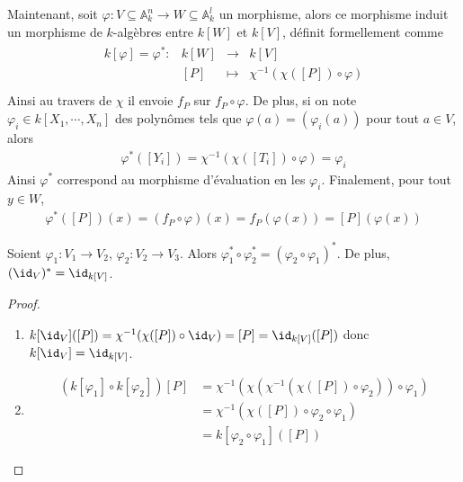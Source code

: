             Maintenant, soit $\varphi : V \subseteq \mathbb{A}_k^n \to W \subseteq \mathbb{A}_k^l$ un morphisme, alors ce morphisme induit un morphisme de $k$-algèbres entre $k[W]$ et $k[V]$, définit formellement comme
            \begin{align*}
                \begin{array}{cccc}
                    k[\varphi] = \varphi^* : & k[W] & \to & k[V] \\
                    & [P] & \mapsto & \chi^{-1}(\chi([P]) \circ \varphi) \\
                \end{array}
            \end{align*}
            Ainsi au travers de $\chi$ il envoie $f_P$ sur $f_P \circ \varphi$. De plus, si on note $\varphi_i \in k[X_1, \cdots, X_n]$ des polynômes tels que $\varphi(a) = (\varphi_i(a))$ pour tout $a \in V$, alors 
            \begin{align*}
                \varphi^*([Y_i]) = \chi^{-1}(\chi([T_i]) \circ \varphi) = \varphi_i
            \end{align*}
            Ainsi $\varphi^*$ correspond au morphisme d'évaluation en les $\varphi_i$. Finalement, pour tout $y \in W$,
            \begin{align*}
                \varphi^*([P])(x) = (f_P \circ \varphi)(x) = f_P(\varphi(x)) = [P](\varphi(x))
            \end{align*}
            \begin{prop}
                \label{phistarfunct}
                Soient $\varphi_1 : V_1 \to V_2$, $\varphi_2 : V_2 \to V_3$. Alors $\varphi_1^* \circ \varphi_2^* = (\varphi_2 \circ \varphi_1)^*$. De plus, $(\id_V)^* = \id_{k[V]}$.
            \end{prop}
            \begin{proof}
                \begin{enumerate}
                    \item $k[\id_V]([P]) = \chi^{-1}(\chi([P]) \circ \id_V) = [P] = \id_{k[V]}([P])$ donc $k[\id_V] = \id_{k[V]}$.
                    \item
                    \begin{align*}
                        (k[\varphi_1] \circ k[\varphi_2])[P] &= \chi^{-1}(\chi( \chi^{-1}(\chi([P]) \circ \varphi_2) ) \circ \varphi_1) \\
                        &= \chi^{-1}(\chi([P]) \circ \varphi_2 \circ \varphi_1) \\
                        &= k[\varphi_2 \circ \varphi_1]([P])
                    \end{align*}
                \end{enumerate}
            \end{proof}
